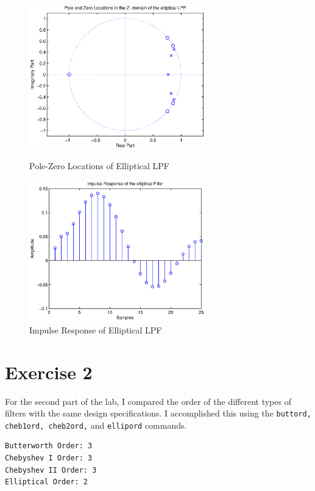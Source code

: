 \documentclass{article}
\begin{document}
\begin{figure}[ht]
\begin{minipage}[b]{0.5\linewidth}
\centering
\includegraphics[width=3in]{project6_11.eps}
\caption{Pole-Zero Locations of Elliptical LPF}
\label{fig:figure11}
\end{minipage}
\hspace{0.5cm}
\begin{minipage}[b]{0.5\linewidth}
\centering
\includegraphics[width=3in]{project6_12.eps}
\caption{Impulse Response of  Elliptical LPF}
\label{fig:figure12}
\end{minipage}
\end{figure}

\newpage

\section*{Exercise 2}
\begin{par}
For the second part of the lab, I compared the order of the different types of filters with the same design specifications.  I accomplished this using the \texttt{buttord, cheb1ord, cheb2ord,} and \texttt{ellipord} commands.
\end{par}
\begin{verbatim}
Butterworth Order: 3
Chebyshev I Order: 3
Chebyshev II Order: 3
Elliptical Order: 2
\end{verbatim}
\end{document}
